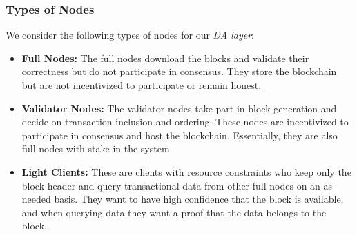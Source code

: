 \documentclass[sigconf, screen=true, nonacm]{acmart}
\newcommand{\DA}{\textit{DA layer}}
\begin{document}
        \subsubsection{Types of Nodes} 
            We consider the following types of nodes for our \DA: 
            \begin{itemize}
                \item \textbf{Full Nodes:} The full nodes download the blocks and validate their correctness but do not participate in consensus. They store the blockchain but are not incentivized to participate or remain honest.
                \item \textbf{Validator Nodes:} The validator nodes take part in block generation and decide on transaction inclusion and ordering. These nodes are incentivized to participate in consensus and host the blockchain. Essentially, they are also full nodes with stake in the system. 
                \item \textbf{Light Clients:} These are clients with resource constraints who keep only the block header and query transactional data from other full nodes on an as-needed basis. They want to have high confidence that the block is available, and when querying data they want a proof that the data belongs to the block. 
            \end{itemize}
\end{document}
